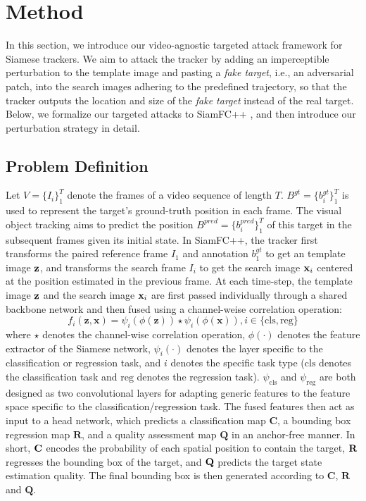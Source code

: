 \documentclass[journal]{IEEEtran}
\begin{document}
\section{Method}

In this section, we introduce our video-agnostic targeted attack framework for Siamese trackers. We aim to attack the tracker by adding an imperceptible perturbation to the template image and pasting a \textit{fake target}, i.e., an adversarial patch, into the search images adhering to the predefined trajectory, so that the tracker outputs the location and size of the \textit{fake target} instead of the real target. Below, we formalize our targeted attacks to SiamFC++ \cite{SiamFC++}, and then introduce our perturbation strategy in detail.
 
\subsection{Problem Definition}

Let $V=\{I_i\}_1^T$ denote the frames of a video sequence of length $T$. $B^{gt}=\{b^{gt}_i\}_1^T$ is used to represent the target's ground-truth position in each frame. The visual object tracking aims to predict the position $B^{pred}=\{b^{pred}_i\}_1^T$ of this target in the subsequent frames given its initial state. In SiamFC++, the tracker first transforms the paired reference frame $I_1$ and annotation $b_1^{gt}$ to get an template image $\textbf z$, and transforms the search frame $I_i$ to get the search image $\textbf x_i$ centered at the position estimated in the previous frame. At each time-step, the template image $\textbf z$ and the search image $\textbf x_i$ are first passed individually through a shared backbone network and then fused using a channel-weise correlation operation:
\begin{equation}
  f_{i}(\mathbf{z}, \mathbf{x})=\psi_{i}(\phi(\mathbf{z})) \star \psi_{i}(\phi(\mathbf{x})), i \in\{\mathrm{cls}, \text {reg}\}
\end{equation}
where $\star$ denotes the channel-wise correlation operation, $\phi(\cdot)$ denotes the feature extractor of the Siamese network, $\psi_i(\cdot)$ denotes the layer specific to the classification or regression task, and $i$ denotes the specific task type ($\mathrm{cls}$ denotes the classification task and $\mathrm{reg}$ denotes the regression task). $\psi_{\mathrm{cls}}$ and $\psi_{\mathrm{reg}}$ are both designed as two convolutional layers for adapting generic features to the feature space specific to the classification/regression task. The fused features then act as input to a head network, which predicts a classification map $\textbf{C}$, a bounding box regression map $\textbf{R}$, and a quality assessment map $\textbf{Q}$ in an anchor-free manner. In short, $\textbf C$ encodes the probability of each spatial position to contain the target, $\textbf R$ regresses the bounding box of the target, and $\textbf Q$ predicts the target state estimation quality. The final bounding box is then generated according to $\textbf{C}$, $\textbf{R}$ and $\textbf{Q}$.
\end{document}

